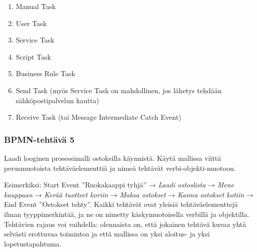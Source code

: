 \documentclass[
  finnish,
  letterpaper,
  DIV=11,
  numbers=noendperiod,
  oneside]{scrreprt}
\providecommand{\tightlist}{%
  \setlength{\itemsep}{0pt}\setlength{\parskip}{0pt}}
\begin{document}
\begin{tcolorbox}[enhanced jigsaw, arc=.35mm, bottomrule=.15mm, bottomtitle=1mm, breakable, colback=white, colbacktitle=quarto-callout-tip-color!10!white, colframe=quarto-callout-tip-color-frame, coltitle=black, left=2mm, leftrule=.75mm, opacityback=0, opacitybacktitle=0.6, rightrule=.15mm, title=\textcolor{quarto-callout-tip-color}{\faLightbulb}\hspace{0.5em}{Malliratkaisu}, titlerule=0mm, toprule=.15mm, toptitle=1mm]

\begin{enumerate}
\def\labelenumi{\arabic{enumi}.}
\tightlist
\item
  Manual Task
\item
  User Task
\item
  Service Task
\item
  Script Task
\item
  Business Rule Task
\item
  Send Task (myös Service Task on mahdollinen, jos lähetys tehdään
  sähköpostipalvelun kautta)
\item
  Receive Task (tai Message Intermediate Catch Event)
\end{enumerate}

\end{tcolorbox}

\subsubsection{BPMN-tehtävä 5}\label{bpmn-tehtuxe4vuxe4-5}

Laadi looginen prosessimalli ostoksilla käynnistä. Käytä mallissa viittä
perusmuotoista tehtäväelementtiä ja nimeä tehtävät
verbi-objekti-muotoon.

\begin{tcolorbox}[enhanced jigsaw, arc=.35mm, bottomrule=.15mm, bottomtitle=1mm, breakable, colback=white, colbacktitle=quarto-callout-tip-color!10!white, colframe=quarto-callout-tip-color-frame, coltitle=black, left=2mm, leftrule=.75mm, opacityback=0, opacitybacktitle=0.6, rightrule=.15mm, title=\textcolor{quarto-callout-tip-color}{\faLightbulb}\hspace{0.5em}{Malliratkaisu}, titlerule=0mm, toprule=.15mm, toptitle=1mm]

Esimerkiksi: Start Event ''Ruokakaappi tyhjä'' → \emph{Laadi ostoslista}
→ \emph{Mene kauppaan} → \emph{Kerää tuotteet koriin} → \emph{Maksa
ostokset} → \emph{Kanna ostokset kotiin} → End Event ''Ostokset tehty''.
Kaikki tehtävät ovat yleisiä tehtäväelementtejä ilman tyyppimerkintää,
ja ne on nimetty käskymuotoisella verbillä ja objektilla. Tehtävien
rajaus voi vaihdella: olennaista on, että jokainen tehtävä kuvaa yhtä
selvästi erottuvaa toimintoa ja että mallissa on yksi aloitus- ja yksi
lopetustapahtuma.

\end{tcolorbox}
\end{document}
